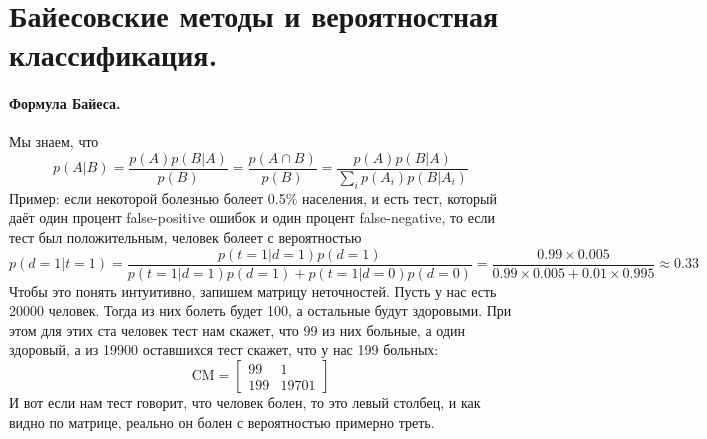 \documentclass{article}
\begin{document}
    \section{Байесовские методы и вероятностная классификация.}
    \paragraph{Формула Байеса.}
    Мы знаем, что
    \[
    p(A|B)=\frac{p(A)p(B|A)}{p(B)}=\frac{p(A\cap B)}{p(B)}=\frac{p(A)p(B|A)}{\sum\limits_ip(A_i)p(B|A_i)}
    \]
    Пример: если некоторой болезнью болеет 0.5\% населения, и есть тест, который даёт один процент false-positive ошибок и один процент false-negative, то если тест был положительным, человек болеет с вероятностью
    \[
    p(d=1|t=1)=\frac{p(t=1|d=1)p(d=1)}{p(t=1|d=1)p(d=1)+p(t=1|d=0)p(d=0)}=\frac{0.99\times 0.005}{0.99\times 0.005+0.01\times 0.995}\approx0.33
    \]
    Чтобы это понять интуитивно, запишем матрицу неточностей. Пусть у нас есть 20000 человек. Тогда из них болеть будет 100, а остальные будут здоровыми. При этом для этих ста человек тест нам скажет, что 99 из них больные, а один здоровый, а из 19900 оставшихся тест скажет, что у нас 199 больных:
    \[
    \mathrm{CM}=\left[\begin{matrix}99&1\\199&19701\end{matrix}\right]
    \]
    И вот если нам тест говорит, что человек болен, то это левый столбец, и как видно по матрице, реально он болен с вероятностью примерно треть.
\end{document}
